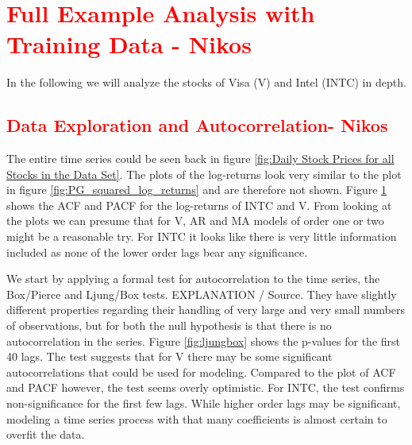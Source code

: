 \section{\textcolor{red}{Full Example Analysis with Training Data  - Nikos}}
In the following we will analyze the stocks of Visa (V) and Intel (INTC) in depth. 

\subsection{\textcolor{red}{Data Exploration and Autocorrelation- Nikos}}
The entire time series could be seen back in figure \ref{fig:Daily Stock Prices for all Stocks in the Data Set}. The plots of the log-returns look very similar to the plot in figure \ref{fig:PG_squared_log_returns} and are therefore not shown. Figure \ref{fig:INTC_V_ACF_log_returns} shows the ACF and PACF for the log-returns of INTC and V. From looking at the plots we can presume that for V, AR and MA models of order one or two might be a reasonable try. For INTC it looks like there is very little information included as none of the lower order lags bear any significance. 

\begin{figure}[h!]
    \centering
    \begin{adjustbox}{width=.95\textwidth,center}
    
    \end{adjustbox}
    \begin{adjustbox}{width=.95\textwidth,center}
    
    \end{adjustbox} 
    \caption{}
    \label{fig:INTC_V_ACF_log_returns}
\end{figure}{}

We start by applying a formal test for autocorrelation to the time series, the Box/Pierce and Ljung/Box tests. EXPLANATION / Source. They have slightly different properties regarding their handling of very large and very small numbers of observations, but for both the null hypothesis is that there is no autocorrelation in the series. Figure \ref{fig:ljungbox} shows the p-values for the first 40 lags. The test suggests that for V there may be some significant autocorrelations that could be used for modeling. Compared to the plot of ACF and PACF however, the test seems overly optimistic. For INTC, the test confirms non-significance for the first few lags. While higher order lags may be significant, modeling a time series process with that many coefficients is almost certain to overfit the data. 

